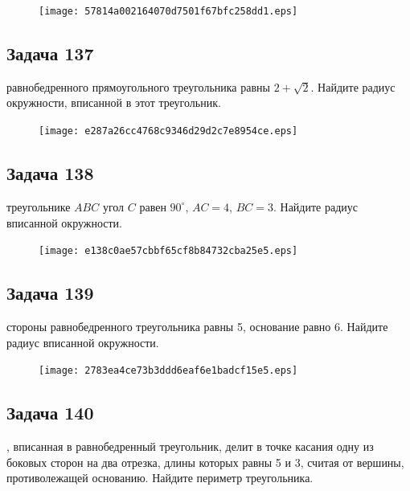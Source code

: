 \documentclass[a4paper,10pt]{article} %
\begin{document}
\begin{spacing}{1.0}
{\vspace{1.5cm}

\begin{figure}{\texttt{[image: 57814a002164070d7501f67bfc258dd1.eps]}}\end{figure}
\subsection*{Задача 137}
 равнобедренного прямоугольного треугольника равны $2 + \sqrt{2}$. Найдите радиус окружности, вписанной в этот треугольник.

\vspace{1.5cm}

\begin{figure}{\texttt{[image: e287a26cc4768c9346d29d2c7e8954ce.eps]}}\end{figure}
\subsection*{Задача 138}
 треугольнике $ABC$ угол $C$ равен $90^\circ$, ${AC=4}$, $BC=3$. Найдите радиус вписанной окружности.

\vspace{1.5cm}

\begin{figure}{\texttt{[image: e138c0ae57cbbf65cf8b84732cba25e5.eps]}}\end{figure}
\subsection*{Задача 139}
 стороны равнобедренного треугольника равны 5, основание равно 6. Найдите радиус вписанной окружности.

\vspace{1.5cm}

\begin{figure}{\texttt{[image: 2783ea4ce73b3ddd6eaf6e1badcf15e5.eps]}}\end{figure}
\subsection*{Задача 140}
, вписанная в равнобедренный треугольник, делит в точке касания одну из боковых сторон на два отрезка, длины которых равны 5 и 3, считая от вершины, противолежащей основанию. Найдите периметр треугольника. 

}
\end{spacing}
\end{document}
